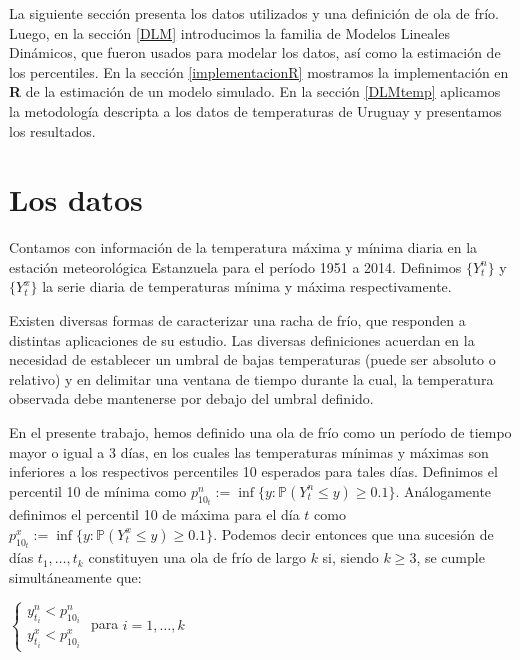 \documentclass[12pt]{article}\usepackage[]{graphicx}\usepackage[]{color}
\newcommand{\p}{\mathbb{P}}
\begin{document}
La siguiente sección presenta los datos utilizados y una definición de ola de frío. Luego, en la sección \ref{DLM} introducimos la familia de Modelos Lineales Dinámicos, que fueron usados para modelar los datos, así como la estimación de los percentiles. En la sección \ref{implementacionR} mostramos la implementación en \textbf{R} de la estimación de un modelo simulado. En la sección \ref{DLMtemp} aplicamos la metodología descripta a los datos de temperaturas de Uruguay y presentamos los resultados.

\section{Los datos}


Contamos con información de la temperatura máxima y mínima diaria en la estación meteorológica Estanzuela para el período 1951 a 2014. Definimos $\{Y^n_{t}\}$ y $\{Y^x_{t}\}$ la serie diaria de temperaturas mínima y máxima respectivamente.

Existen diversas formas de caracterizar una racha de frío, que responden a distintas aplicaciones de su estudio. Las diversas definiciones acuerdan en la necesidad de establecer un umbral de bajas temperaturas (puede ser absoluto o relativo) y en delimitar una ventana de tiempo durante la cual, la temperatura observada debe mantenerse por debajo del umbral definido. 

En el presente trabajo, hemos definido una ola de frío como un período de tiempo mayor o igual a 3 días, en los cuales las temperaturas mínimas y máximas son inferiores a los respectivos percentiles 10 esperados para tales días. Definimos el percentil 10 de mínima como $p^n_{10_t}:= \inf\{y: \p(Y^n_t \leq y)\geq 0.1\}$. Análogamente definimos el percentil 10 de máxima para el día $t$ como $p^x_{10_t}:= \inf\{y: \p(Y^x_t \leq y)\geq 0.1\}$. Podemos decir entonces que una sucesión de días $t_1, \dots, t_k$ constituyen una ola de frío de largo $k$ si, siendo $k\geq 3$, se cumple simultáneamente que:

$\begin{cases} y^n_{t_i} < p^n_{10_i}  \\ y^x_{t_i} < p^x_{10_i} \end{cases}$ para $i=1,\dots,k$
\end{document}
